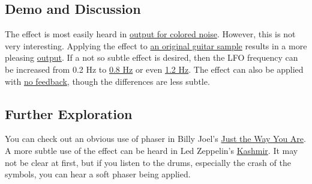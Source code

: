 \subsection{Demo and Discussion}
The effect is most easily heard in \href{run:../OutputAudio/phaser_noise_{depth=1}{fc_min=200Hz}{fc_max=4000Hz}{f_LFO=0.2Hz}.wav}{output for colored noise}. However, this is not very interesting. Applying the effect to \href{run:../InputAudio/11-014 Guitar Src.wav}{an original guitar sample} results in a more pleasing \href{run:../OutputAudio/phaser_11-014 Guitar Src_{depth=1}{fc_min=200Hz}{fc_max=4000Hz}{f_LFO=0.2Hz}.wav}{output}. If a not so subtle effect is desired, then the LFO frequency can be increased from 0.2 Hz to \href{run:../OutputAudio/phaser_11-014 Guitar Src_{depth=1}{fc_min=200Hz}{fc_max=4000Hz}{f_LFO=0.8Hz}.wav}{0.8 Hz} or even \href{run:../OutputAudio/phaser_11-014 Guitar Src_{depth=1}{fc_min=200Hz}{fc_max=4000Hz}{f_LFO=1.2Hz}.wav}{1.2 Hz}. The effect can also be applied with \href{run:../OutputAudio/phaser_nofb_11-014 Guitar Src_{depth=1}{fc_min=200Hz}{fc_max=4000Hz}{f_LFO=0.2Hz}.wav}{no feedback}, though the differences are less subtle.

\subsection{Further Exploration}
You can check out an obvious use of phaser in Billy Joel's \href{https://www.youtube.com/watch?v=tJWM5FmZyqU}{Just the Way You Are}. A more subtle use of the effect can be heard in Led Zeppelin's \href{https://www.youtube.com/watch?v=ZDwotNLyz10}{Kashmir}. It may not be clear at first, but if you listen to the drums, especially the crash of the symbols, you can hear a soft phaser being applied.